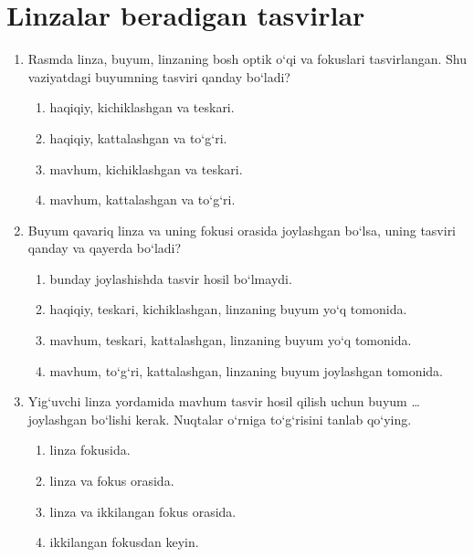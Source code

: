 
\section{Linzalar beradigan tasvirlar}

\begin{enumerate}
\item Rasmda linza, buyum, linzaning bosh optik o‘qi va fokuslari tasvirlangan. Shu vaziyatdagi buyumning tasviri qanday bo‘ladi?


\begin{enumerate}[label=\Alph*)]
\item haqiqiy, kichiklashgan va teskari.
\item haqiqiy, kattalashgan va to‘g‘ri.
\item mavhum, kichiklashgan va teskari.
\item mavhum, kattalashgan va to‘g‘ri.
\end{enumerate}

\item Buyum qavariq linza va uning fokusi orasida joylashgan bo‘lsa, uning tasviri qanday va qayerda bo‘ladi?

\begin{enumerate}[label=\Alph*)]
\item bunday joylashishda tasvir hosil bo‘lmaydi.
\item haqiqiy, teskari, kichiklashgan, linzaning buyum yo‘q tomonida.
\item mavhum, teskari, kattalashgan, linzaning buyum yo‘q tomonida.
\item mavhum, to‘g‘ri, kattalashgan, linzaning buyum joylashgan tomonida.
\end{enumerate}

\item Yig‘uvchi linza yordamida mavhum tasvir hosil qilish uchun buyum \dots joylashgan bo‘lishi kerak. Nuqtalar o‘rniga to‘g‘risini tanlab qo‘ying.

\begin{enumerate}[label=\Alph*)]
\item linza fokusida.
\item linza va fokus orasida.
\item linza va ikkilangan fokus orasida.
\item ikkilangan fokusdan keyin.
\end{enumerate}


\end{enumerate}
